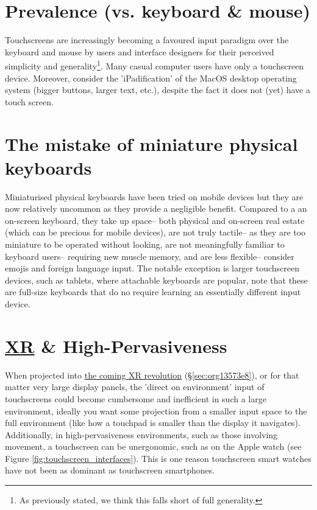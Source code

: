 \documentclass[logo,bsc,singlespacing,parskip]{infthesis}
\begin{document}
\section{Prevalence (vs. keyboard \& mouse)}
\label{sec:org6322047}
Touchscreens are increasingly becoming a favoured input paradigm over the keyboard and mouse by users and interface designers for their perceived simplicity and generality\footnote{As previously stated, we think this falls short of full generality.}.
Many casual computer users have only a touchscreen device.
Moreover, consider the 'iPadification' of the MacOS desktop operating system (bigger buttons, larger text, etc.), despite the fact it does not (yet) have a touch screen.

\section{The mistake of miniature physical keyboards}
\label{sec:orgba6ae51}
Miniaturised physical keyboards have been tried on mobile devices but they are now relatively uncommon as they provide a negligible benefit.
Compared to a an on-screen keyboard, they take up space-- both physical and on-screen real estate (which can be precious for mobile devices), are not truly tactile-- as they are too miniature to be operated without looking, are not meaningfully familiar to keyboard users-- requiring new muscle memory, and are less flexible-- consider emojis and foreign language input.
The notable exception is larger touchscreen devices, such as tablets, where attachable keyboards are popular, note that these are full-size keyboards that do no require learning an essentially different input device.

\section{\hyperref[org1d567af]{XR} \& High-Pervasiveness}
\label{sec:org9a4d6f2}
When projected into \hyperref[sec:org13573e8]{the coming XR revolution} (\S \ref{sec:org13573e8}), or for that matter very large display panels, the 'direct on environment' input of touchscreens could become cumbersome and inefficient in such a large environment, ideally you want some projection from a smaller input space to the full environment (like how a touchpad is smaller than the display it navigates).
Additionally, in high-pervasiveness environments, such as those involving movement, a touchscreen can be unergonomic, such as on the Apple watch (see Figure \ref{fig:touchscreen_interfaces}).
This is one reason touchscreen smart watches have not been as dominant as touchscreen smartphones.
\end{document}

